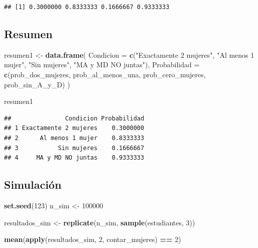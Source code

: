 \documentclass[
]{article}
\newenvironment{Shaded}{\begin{snugshade}}{\end{snugshade}}
\newcommand{\AttributeTok}[1]{\textcolor[rgb]{0.13,0.29,0.53}{#1}}
\newcommand{\DecValTok}[1]{\textcolor[rgb]{0.00,0.00,0.81}{#1}}
\newcommand{\FunctionTok}[1]{\textcolor[rgb]{0.13,0.29,0.53}{\textbf{#1}}}
\newcommand{\NormalTok}[1]{#1}
\newcommand{\OtherTok}[1]{\textcolor[rgb]{0.56,0.35,0.01}{#1}}
\newcommand{\SpecialCharTok}[1]{\textcolor[rgb]{0.81,0.36,0.00}{\textbf{#1}}}
\newcommand{\StringTok}[1]{\textcolor[rgb]{0.31,0.60,0.02}{#1}}
\begin{document}
\begin{verbatim}
## [1] 0.3000000 0.8333333 0.1666667 0.9333333
\end{verbatim}

\subsection{Resumen}\label{resumen}

\begin{Shaded}
\begin{Highlighting}[]
\NormalTok{resumen1 }\OtherTok{\textless{}{-}} \FunctionTok{data.frame}\NormalTok{(}
  \AttributeTok{Condicion =} \FunctionTok{c}\NormalTok{(}\StringTok{"Exactamente 2 mujeres"}\NormalTok{, }
                \StringTok{"Al menos 1 mujer"}\NormalTok{, }
                \StringTok{"Sin mujeres"}\NormalTok{, }
                \StringTok{"MA y MD NO juntas"}\NormalTok{),}
  \AttributeTok{Probabilidad =} \FunctionTok{c}\NormalTok{(prob\_dos\_mujeres, prob\_al\_menos\_una, prob\_cero\_mujeres, prob\_sin\_A\_y\_D)}
\NormalTok{)}

\NormalTok{resumen1}
\end{Highlighting}
\end{Shaded}

\begin{verbatim}
##               Condicion Probabilidad
## 1 Exactamente 2 mujeres    0.3000000
## 2      Al menos 1 mujer    0.8333333
## 3           Sin mujeres    0.1666667
## 4     MA y MD NO juntas    0.9333333
\end{verbatim}

\subsection{Simulación}\label{simulaciuxf3n}

\begin{Shaded}
\begin{Highlighting}[]
\FunctionTok{set.seed}\NormalTok{(}\DecValTok{123}\NormalTok{)}
\NormalTok{n\_sim }\OtherTok{\textless{}{-}} \DecValTok{100000}

\NormalTok{resultados\_sim }\OtherTok{\textless{}{-}} \FunctionTok{replicate}\NormalTok{(n\_sim, }\FunctionTok{sample}\NormalTok{(estudiantes, }\DecValTok{3}\NormalTok{))}

\FunctionTok{mean}\NormalTok{(}\FunctionTok{apply}\NormalTok{(resultados\_sim, }\DecValTok{2}\NormalTok{, contar\_mujeres) }\SpecialCharTok{==} \DecValTok{2}\NormalTok{)}
\end{Highlighting}
\end{Shaded}
\end{document}
